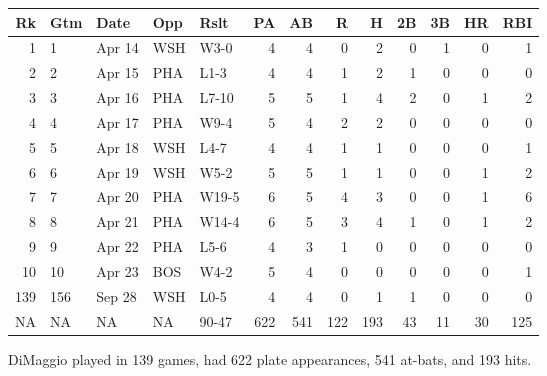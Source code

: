 \documentclass[
  11pt,
]{book}
\newenvironment{Shaded}{\begin{snugshade}}{\end{snugshade}}
\newcommand{\CommentTok}[1]{\textcolor[rgb]{0.56,0.35,0.01}{\textit{#1}}}
\newcommand{\DecValTok}[1]{\textcolor[rgb]{0.00,0.00,0.81}{#1}}
\newcommand{\FunctionTok}[1]{\textcolor[rgb]{0.00,0.00,0.00}{#1}}
\newcommand{\NormalTok}[1]{#1}
\newcommand{\OtherTok}[1]{\textcolor[rgb]{0.56,0.35,0.01}{#1}}
\newcommand{\SpecialCharTok}[1]{\textcolor[rgb]{0.00,0.00,0.00}{#1}}
\theoremstyle{definition}
\theoremstyle{definition}
\theoremstyle{definition}
\theoremstyle{definition}
\theoremstyle{remark}
\begin{document}
\begin{table}[H]
\centering
\begin{tabular}{rllllrrrrrrrr}
\toprule
Rk & Gtm & Date & Opp & Rslt & PA & AB & R & H & 2B & 3B & HR & RBI\\
\midrule
1 & 1 & Apr 14 & WSH & W3-0 & 4 & 4 & 0 & 2 & 0 & 1 & 0 & 1\\
2 & 2 & Apr 15 & PHA & L1-3 & 4 & 4 & 1 & 2 & 1 & 0 & 0 & 0\\
3 & 3 & Apr 16 & PHA & L7-10 & 5 & 5 & 1 & 4 & 2 & 0 & 1 & 2\\
4 & 4 & Apr 17 & PHA & W9-4 & 5 & 4 & 2 & 2 & 0 & 0 & 0 & 0\\
5 & 5 & Apr 18 & WSH & L4-7 & 4 & 4 & 1 & 1 & 0 & 0 & 0 & 1\\
6 & 6 & Apr 19 & WSH & W5-2 & 5 & 5 & 1 & 1 & 0 & 0 & 1 & 2\\
7 & 7 & Apr 20 & PHA & W19-5 & 6 & 5 & 4 & 3 & 0 & 0 & 1 & 6\\
8 & 8 & Apr 21 & PHA & W14-4 & 6 & 5 & 3 & 4 & 1 & 0 & 1 & 2\\
9 & 9 & Apr 22 & PHA & L5-6 & 4 & 3 & 1 & 0 & 0 & 0 & 0 & 0\\
10 & 10 & Apr 23 & BOS & W4-2 & 5 & 4 & 0 & 0 & 0 & 0 & 0 & 1\\
139 & 156 & Sep 28 & WSH & L0-5 & 4 & 4 & 0 & 1 & 1 & 0 & 0 & 0\\
NA & NA & NA & NA & 90-47 & 622 & 541 & 122 & 193 & 43 & 11 & 30 & 125\\
\bottomrule
\end{tabular}
\end{table}

\vfill
\newpage

DiMaggio played in 139 games, had 622 plate appearances, 541 at-bats, and 193 hits.

\begin{Shaded}
\end{Shaded}
\end{document}
